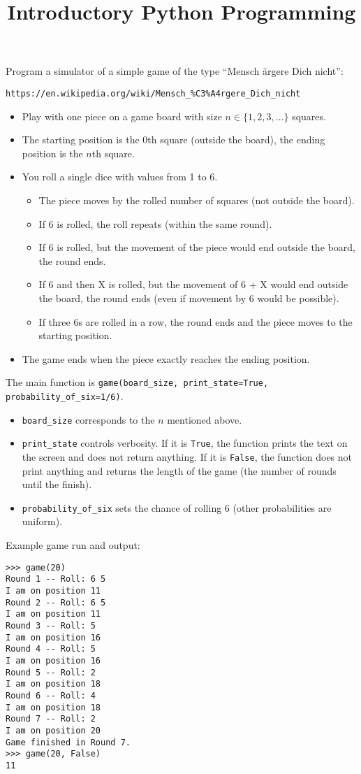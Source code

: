 \documentclass[12pt,a4paper]{article}
\title{\textbf{Introductory Python Programming}}
\author{}
\date{}
\begin{document}

\vspace*{-1.35cm}
\noindent
Program a simulator of a simple game of the type ``Mensch ärgere Dich nicht'':

\begin{verbatim}
https://en.wikipedia.org/wiki/Mensch_%C3%A4rgere_Dich_nicht
\end{verbatim}

\begin{itemize}
\item Play with one piece on a game board with size $n\in\{1, 2, 3, \dots\}$ squares.
\item The starting position is the 0th square (outside the board), the ending position is the $n$th square.
\item You roll a single dice with values from 1 to 6.
\begin{itemize}
\item The piece moves by the rolled number of squares (not outside the board).
\item If 6 is rolled, the roll repeats (within the same round).
\item If 6 is rolled, but the movement of the piece would end outside the board, the round ends.
\item If 6 and then X is rolled, but the movement of 6 + X would end outside the board, the round ends (even if movement by 6 would be possible).
\item If three 6s are rolled in a row, the round ends and the piece moves to the starting position.
\end{itemize}
\item The game ends when the piece exactly reaches the ending position.
\end{itemize}
The main function is \texttt{game(board\_size, print\_state=True, probability\_of\_six=1/6)}.

\begin{itemize}
\item \texttt{board\_size} corresponds to the $n$ mentioned above.
\item \texttt{print\_state} controls verbosity. If it is \texttt{True}, the function prints the text on the screen and does not return anything. If it is \texttt{False}, the function does not print anything and returns the length of the game (the number of rounds until the finish).
\item \texttt{probability\_of\_six} sets the chance of rolling 6 (other probabilities are uniform).
\end{itemize}
Example game run and output:

\begin{lstlisting}[deletekeywords={in,round}]
>>> game(20)
Round 1 -- Roll: 6 5 
I am on position 11
Round 2 -- Roll: 6 5 
I am on position 11
Round 3 -- Roll: 5 
I am on position 16
Round 4 -- Roll: 5 
I am on position 16
Round 5 -- Roll: 2 
I am on position 18
Round 6 -- Roll: 4 
I am on position 18
Round 7 -- Roll: 2 
I am on position 20
Game finished in Round 7.
>>> game(20, False)
11
\end{lstlisting}
\end{document}

